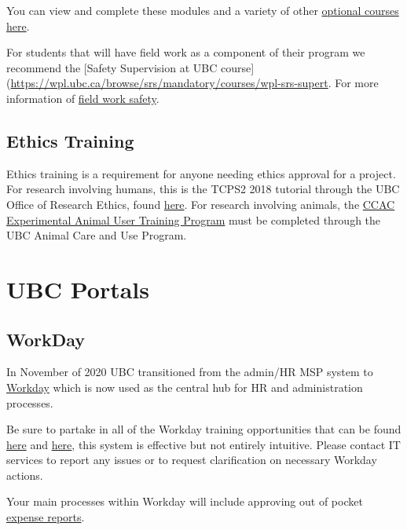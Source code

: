 \documentclass[
]{book}
\begin{document}
You can view and complete these modules and a variety of other \href{https://wpl.ubc.ca/}{optional courses here}.

For students that will have field work as a component of their program we recommend the {[}Safety Supervision at UBC course{]}(\url{https://wpl.ubc.ca/browse/srs/mandatory/courses/wpl-srs-supert}. For more information of \protect\hyperlink{fieldworkprep}{field work safety}.

\hypertarget{ethicstraining}{%
\section*{Ethics Training}\label{ethicstraining}}

Ethics training is a requirement for anyone needing ethics approval for a project. For research involving humans, this is the TCPS2 2018 tutorial through the UBC Office of Research Ethics, found \href{https://ethics.research.ubc.ca/education-training/online-tutorials-training}{here}. For research involving animals, the \href{https://animalcare.ubc.ca/training/ccac-online-ethics}{CCAC Experimental Animal User Training Program} must be completed through the UBC Animal Care and Use Program.

\hypertarget{ubcportals}{%
\chapter*{UBC Portals}\label{ubcportals}}

\hypertarget{workday}{%
\section*{WorkDay}\label{workday}}

In November of 2020 UBC transitioned from the admin/HR MSP system to \href{https://hr.ubc.ca/working-ubc/welcome-workday}{Workday} which is now used as the central hub for HR and administration processes.

Be sure to partake in all of the Workday training opportunities that can be found \href{https://irp.ubc.ca/training}{here} and \href{https://wpl.ubc.ca/browse/irp-training/}{here}, this system is effective but not entirely intuitive. Please contact IT services to report any issues or to request clarification on necessary Workday actions.

Your main processes within Workday will include approving out of pocket \protect\hyperlink{reimbursements}{expense reports}.
\end{document}
